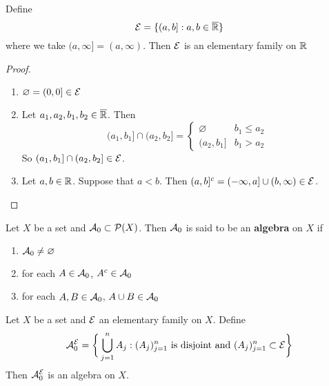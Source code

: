 \documentclass{book}
\begin{document}
	\begin{ex}  
		Define $$\mathcal{E} = \{(a,b]: a,b \in \overline{\mathbb{R}}\}$$ where we take $(a, \infty] = (a, \infty)$. Then $\mathcal{E}$ is an elementary family on $\mathbb{R}$
	\end{ex}
	
	\begin{proof}\
		\begin{enumerate}
			\item $\varnothing = (0,0] \in \mathcal{E}$
			\item Let $a_1, a_2, b_1, b_2 \in \overline{\mathbb{R}}$. Then 
			\[
			(a_1, b_1] \cap  (a_2, b_2] =
			\begin{cases}
				\varnothing  & b_1 \leq a_2 \\
				(a_2, b_1] & b_1 > a_2 
			\end{cases} 
			\]
			So $(a_1, b_1] \cap  (a_2, b_2] \in \mathcal{E}$.
			\item Let $a, b \in \mathbb{R}$. Suppose that $a < b$. Then $(a,b]^c = (-\infty, a] \cup (b, \infty) \in \mathcal{E}$. 
		\end{enumerate}
	\end{proof}
	
	\begin{defn}  
		Let $X$ be a set and $\mathcal{A}_0 \subset \mathcal{P}(X)$. Then $\mathcal{A}_0$ is said to be an \textbf{algebra} on $X$ if 
		\begin{enumerate}
			\item $\mathcal{A}_0 \neq \varnothing$
			\item for each $A \in \mathcal{A}_0$, $A^c \in \mathcal{A}_0$
			\item for each $A,B \in \mathcal{A}_0$, $A \cup B \in \mathcal{A}_0$
		\end{enumerate}
	\end{defn}
	
	\begin{ex}  
		Let $X$ be a set and $\mathcal{E}$ an elementary family on $X$. Define $$\mathcal{A}^{\mathcal{E}}_0 = \bigg \{ \bigcup_{j=1}^n A_j: (A_j)_{j=1}^n \text{ is disjoint and } (A_j)_{j=1}^n \subset \mathcal{E} \bigg \}$$ Then $\mathcal{A}^{\mathcal{E}}_0$ is an algebra on $X$.
	\end{ex}	
	
\end{document}
